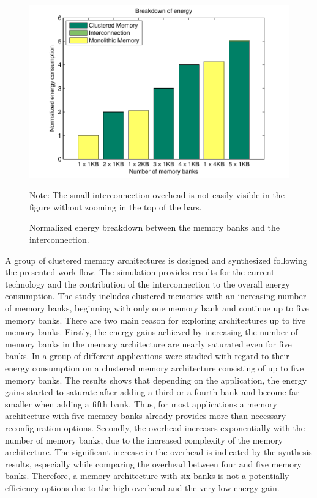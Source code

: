 \begin{figure}
 \centering
 \begin{minipage}{0.9\textwidth} %
 \includegraphics[width =\linewidth]{E/energy2.pdf}
 {\footnotesize Note: The small interconnection overhead is not easily visible in the figure without zooming in the top of the bars.\par}
\end{minipage}
  \caption{Normalized energy breakdown between the memory banks and the interconnection.}
 \label{fig:energyE}
 \end{figure}


A group of clustered memory architectures is designed and synthesized following the presented work-flow.
The simulation provides results for the current technology and the contribution of the interconnection to the overall energy consumption.
The study includes clustered memories with an increasing number of memory banks, beginning with only one memory bank and continue up to five memory banks.
There are two main reason for exploring architectures up to five memory banks.
Firstly, the energy gains achieved by increasing the number of memory banks in the memory architecture are nearly saturated even for five banks.
In \cite{filippopoulos2013exploration} a group of different applications were studied with regard to their energy consumption on a clustered memory architecture consisting of up to five memory banks.
The results shows that depending on the application, the energy gains started to saturate after adding a third or a fourth bank and become far smaller when adding a fifth bank.
Thus, for most applications a memory architecture with five memory banks already provides more than necessary reconfiguration options.  
Secondly, the overhead increases exponentially with the number of memory banks, due to the increased complexity of the memory architecture. 
The significant increase in the overhead is indicated by the synthesis results, especially while comparing the overhead between four and five memory banks.
Therefore, a memory architecture with six banks is not a potentially efficiency options due to the high overhead and the very low energy gain.

